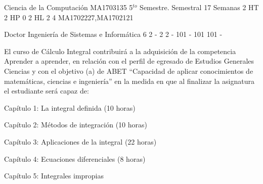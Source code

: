 \documentclass[a4paper,8pt]{article}
\begin{document}
\setNombreProfesor{}
\setGradoProfesorAbreviado{}
\sylabusHeader

\academicaTable
{Ciencia de la Computación} %
{MA1703135} %
{5$^{to}$ Semestre.} %
{Semestral} %
{17 Semanas} %
{2 HT} %
{2 HP} %
{0} %
{2 HL}  %
{2} %
{4} %
{MA1702227,MA1702121} %

\administrativaTable
{Doctor} %
{Ingeniería de Sistemas e Informática} %
{6} %
{2} %
{-} %
{2} %
{2} %
{-} %
{101} %
{-} %
{101} %
{101} %
{-} %


\begin{fundamentacion}
El curso de Cálculo Integral contribuirá a la adquisición de la competencia Aprender a aprender, en relación con el perfil de egresado de Estudios Generales Ciencias y con el objetivo (a) de ABET ``Capacidad de aplicar conocimientos de matemáticas, ciencias e ingeniería'' en la medida en que al finalizar la asignatura el estudiante será capaz de:

\end{fundamentacion}

\begin{sumilla}
\item Capítulo 1: La integral definida (10 horas)
\item Capítulo 2: Métodos de integración (10 horas)
\item Capítulo 3: Aplicaciones de la integral (22 horas)
\item Capítulo 4: Ecuaciones diferenciales (8 horas)
\item Capítulo 5: Integrales impropias

\end{sumilla}

\begin{competenciasAsignatura}
\item {}

\end{competenciasAsignatura}
\end{document}
